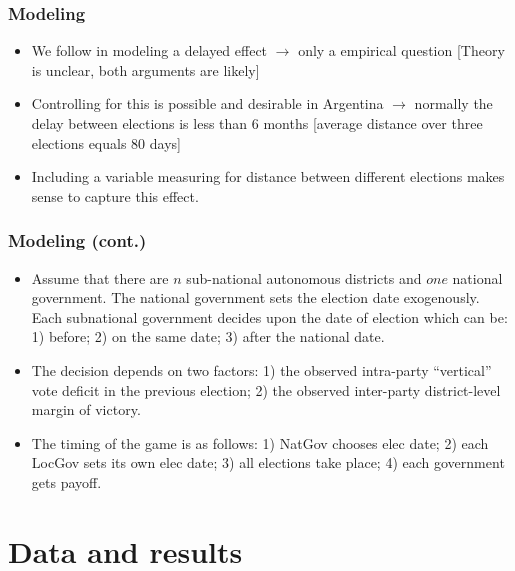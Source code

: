 \documentclass[a4paper,handout,mathserif,final,xcolor=dvipsnames,twocolumn]{beamer}
\begin{document}
\begin{frame}\frametitle{Modeling}
\begin{itemize}\itemsep 15pt
\item We follow \cite{shugart1995} in modeling a delayed effect
$\longrightarrow$ only a empirical question [Theory is unclear, both
arguments are likely]
\item Controlling for this is possible and desirable in Argentina
  $\longrightarrow$ normally the delay between elections is less than
  6 months [average distance over three elections equals 80 days]
\item Including a variable measuring for distance between different
  elections makes sense to capture this effect.
\end{itemize}
\end{frame}


\begin{frame}\frametitle{Modeling (cont.)}
\begin{itemize}\itemsep 15pt
\item Assume that there are $n$ sub-national autonomous districts and $one$
  national government. The national government sets the election date
  exogenously. Each subnational government decides upon the date of
  election which can be: 1) before; 2) on the same date; 3) after the
  national date.
\item The decision depends on two factors: 1) the observed intra-party
  ``vertical'' vote deficit in the previous election; 2) the observed
  inter-party district-level margin of victory.
\item The timing of the game is as follows: 1) NatGov chooses elec
  date; 2) each LocGov sets its own elec date; 3) all elections take
  place; 4) each government gets payoff.
\end{itemize}
\end{frame}


\section{Data and results}
\end{document}
